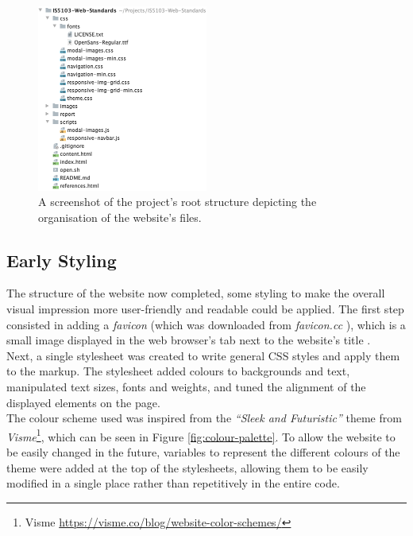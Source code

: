 \documentclass[letterpaper,12pt]{article}
\begin{document}
\begin{figure}[h] 
\centerline{\includegraphics[width=0.5\textwidth]{report/images/root_structure.png}}
\caption{\label{fig:root-structure}A screenshot of the project's root structure depicting the organisation of the website's files.}
\end{figure}

\subsection{Early Styling}
\label{sec:design-content-early-styling}

The structure of the website now completed, some styling to make the overall visual impression more user-friendly and readable could be applied. The first step consisted in adding a \textit{favicon} (which was downloaded from \textit{favicon.cc} \cite{faviconcc}), which is a small image displayed in the web browser's tab next to the website's title \cite{jain2003user}.\\

Next, a single stylesheet was created to write general CSS styles and apply them to the markup. The stylesheet added colours to backgrounds and text, manipulated text sizes, fonts and weights, and tuned the alignment of the displayed elements on the page.\\

The colour scheme used was inspired from the \textit{``Sleek and Futuristic''} theme from \textit{Visme}\footnote{Visme \url{https://visme.co/blog/website-color-schemes/}}, which can be seen in Figure \ref{fig:colour-palette}. To allow the website to be easily changed in the future, variables to represent the different colours of the theme were added at the top of the stylesheets, allowing them to be easily modified in a single place rather than repetitively in the entire code.\\
\end{document}
